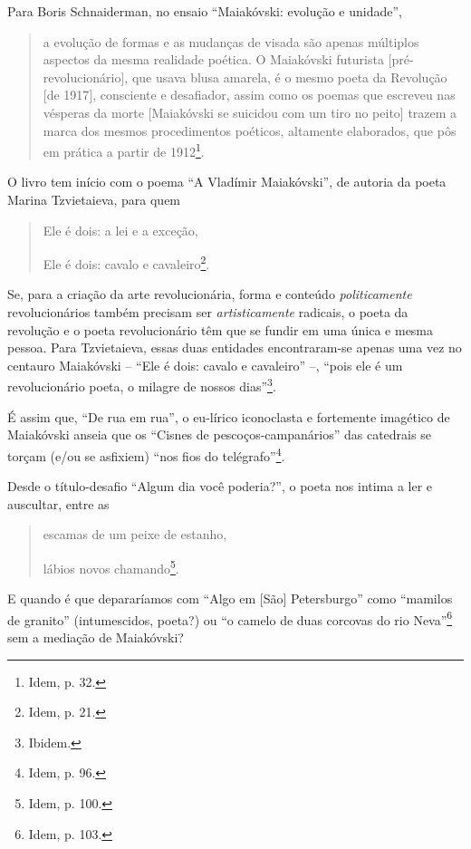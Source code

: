 Para Boris Schnaiderman, no ensaio ``Maiakóvski: evolução e unidade'',

\begin{quote}
a evolução de formas e as mudanças de visada são apenas múltiplos
aspectos da mesma realidade poética. O Maiakóvski futurista
{[}pré-revolucionário{]}, que usava blusa amarela, é o mesmo poeta da
Revolução {[}de 1917{]}, consciente e desafiador, assim como os poemas
que escreveu nas vésperas da morte {[}Maiakóvski se suicidou com um tiro
no peito{]} trazem a marca dos mesmos procedimentos poéticos, altamente
elaborados, que pôs em prática a partir de 1912\footnote{Idem, p. 32.}.
\end{quote}

O livro tem início com o poema ``A Vladímir Maiakóvski'', de autoria da
poeta Marina Tzvietaieva, para quem

\begin{quote}
Ele é dois: a lei e a exceção,

Ele é dois: cavalo e cavaleiro\footnote{Idem, p. 21.}.
\end{quote}

Se, para a criação da arte revolucionária, forma e conteúdo
\emph{politicamente} revolucionários também precisam ser
\emph{artisticamente} radicais, o poeta da revolução e o poeta
revolucionário têm que se fundir em uma única e mesma pessoa. Para
Tzvietaieva, essas duas entidades encontraram-se apenas uma vez no
centauro Maiakóvski -- ``Ele é dois: cavalo e cavaleiro'' --, ``pois ele
é um revolucionário poeta, o milagre de nossos dias''\footnote{Ibidem.}.

É assim que, ``De rua em rua'', o eu-lírico iconoclasta e fortemente
imagético de Maiakóvski anseia que os ``Cisnes de pescoços-campanários''
das catedrais se torçam (e/ou se asfixiem) ``nos fios do
telégrafo''\footnote{Idem, p. 96.}.

Desde o título-desafio ``Algum dia você poderia?'', o poeta nos intima a
ler e auscultar, entre as

\begin{quote}
escamas de um peixe de estanho,

lábios novos chamando\footnote{Idem, p. 100.}.
\end{quote}

E quando é que depararíamos com ``Algo em {[}São{]} Petersburgo'' como
``mamilos de granito'' (intumescidos, poeta?) ou ``o camelo de duas
corcovas do rio Neva''\footnote{Idem, p. 103.} sem a mediação de
Maiakóvski?

